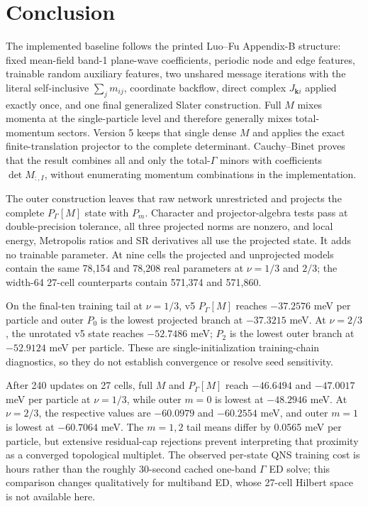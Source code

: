 \section{Conclusion}

The implemented baseline follows the printed Luo--Fu Appendix-B structure:
fixed mean-field band-1 plane-wave coefficients, periodic node and edge
features, trainable random auxiliary features, two unshared message
iterations with the literal self-inclusive $\sum_jm_{ij}$, coordinate
backflow, direct complex $J_{\bm k i}$ applied exactly once, and one final
generalized Slater construction. Full $M$ mixes momenta at the single-particle
level and therefore generally mixes total-momentum sectors. Version 5 keeps
that single dense $M$ and applies the exact finite-translation projector to the
complete determinant. Cauchy--Binet proves that the result combines all and
only the total-$\Gamma$ minors with coefficients $\det M_{:,I}$, without
enumerating momentum combinations in the implementation.

The outer construction leaves that raw network unrestricted and projects the
complete $P_\Gamma[M]$ state with $P_m$. Character and projector-algebra
tests pass at double-precision tolerance, all three projected norms are
nonzero, and local energy,
Metropolis ratios and SR derivatives all use the projected state.  It adds no
trainable parameter. At nine cells the projected and unprojected models contain
the same 78,154 and 78,208 real parameters at $\nu=1/3$ and $2/3$; the
width-64 27-cell counterparts contain 571,374 and 571,860.

On the final-ten training tail at $\nu=1/3$, v5 $P_\Gamma[M]$ reaches
$-37.2576$ meV per particle and outer $P_0$ is the lowest projected branch at
$-37.3215$ meV. At $\nu=2/3$, the unrotated v5 state reaches $-52.7486$ meV;
$P_2$ is the lowest outer branch at $-52.9124$ meV per particle.
These are single-initialization training-chain diagnostics, so they do not
establish convergence or resolve seed sensitivity.

After 240 updates on 27 cells, full $M$ and $P_\Gamma[M]$ reach $-46.6494$
and $-47.0017$ meV per particle at $\nu=1/3$, while outer $m=0$ is lowest at
$-48.2946$ meV. At $\nu=2/3$, the respective values are $-60.0979$ and
$-60.2554$ meV, and outer $m=1$ is lowest at $-60.7064$ meV. The $m=1,2$
tail means differ by 0.0565 meV per particle,
but extensive residual-cap rejections prevent interpreting that proximity as
a converged topological multiplet. The observed per-state QNS training cost
is hours rather than the roughly 30-second cached one-band $\Gamma$ ED solve;
this comparison changes qualitatively for multiband ED, whose 27-cell Hilbert
space is not available here.

